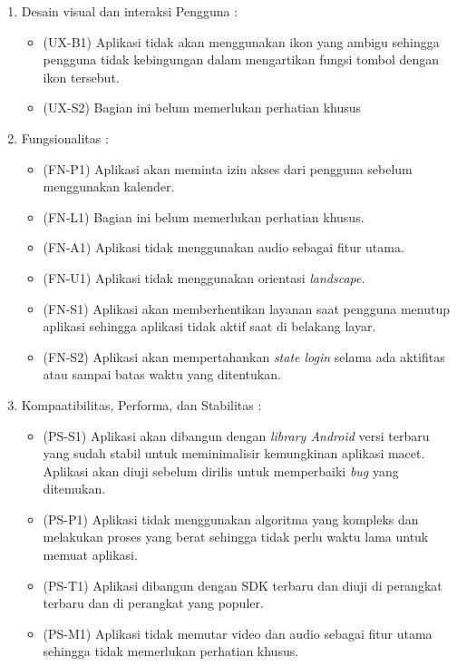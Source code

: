 \begin{enumerate}
    \item Desain visual dan interaksi Pengguna : 
    \begin{itemize}
        \item (UX-B1) Aplikasi tidak akan menggunakan ikon yang ambigu sehingga pengguna tidak kebingungan dalam mengartikan fungsi tombol dengan ikon tersebut. 
        \item (UX-S2) Bagian ini belum memerlukan perhatian khusus %
    \end{itemize}
    \item Fungsionalitas : 
    \begin{itemize}
        \item (FN-P1) Aplikasi akan meminta izin akses dari pengguna sebelum menggunakan kalender.
        \item (FN-L1) Bagian ini belum memerlukan perhatian khusus.
        \item (FN-A1) Aplikasi tidak menggunakan audio sebagai fitur utama.
        \item (FN-U1) Aplikasi tidak menggunakan orientasi \textit{landscape}.
        \item (FN-S1) Aplikasi akan memberhentikan layanan saat pengguna menutup aplikasi sehingga aplikasi tidak aktif saat di belakang layar.
        \item (FN-S2) Aplikasi akan mempertahankan \textit{state login} selama ada aktifitas atau sampai batas waktu yang ditentukan. 
    \end{itemize}
    \item Kompaatibilitas, Performa, dan Stabilitas : 
    \begin{itemize}
        \item (PS-S1) Aplikasi akan dibangun dengan \textit{library Android} versi terbaru yang sudah stabil untuk meminimalisir kemungkinan aplikasi macet. Aplikasi akan diuji sebelum dirilis untuk memperbaiki \textit{bug} yang ditemukan.
        \item (PS-P1) Aplikasi tidak menggunakan algoritma yang kompleks dan melakukan proses yang berat sehingga tidak perlu waktu lama untuk memuat aplikasi.
        \item (PS-T1) Aplikasi dibangun dengan SDK terbaru dan diuji di perangkat terbaru dan di perangkat yang populer.
        \item (PS-M1) Aplikasi tidak memutar video dan audio sebagai fitur utama sehingga tidak memerlukan perhatian khusus.

\end{itemize}
\end{enumerate}
